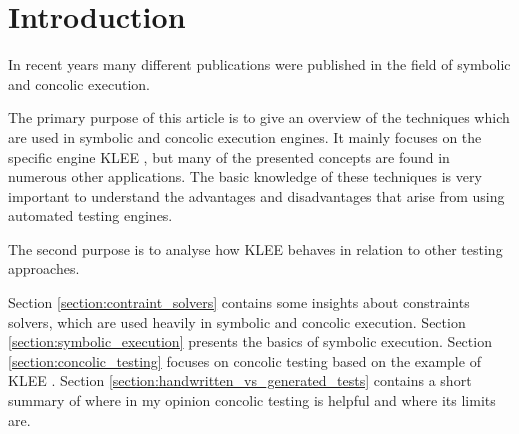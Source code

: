 \section{Introduction}
In recent years many different publications were published in the field of symbolic and concolic execution. 

The primary purpose of this article is to give an overview of the techniques which are used in symbolic and concolic execution engines.
It mainly focuses on the specific engine KLEE \cite{Cadar:2008:KUA:1855741.1855756}, but many of the presented concepts are found in numerous other applications.
The basic knowledge of these techniques is very important to understand the advantages and disadvantages that arise from using automated testing engines.

The second purpose is to analyse how KLEE behaves in relation to other testing approaches.

Section \ref{section:contraint_solvers} contains some insights about constraints solvers, which are used heavily in symbolic and concolic execution.
Section \ref{section:symbolic_execution} presents the basics of symbolic execution.
Section \ref{section:concolic_testing} focuses on concolic testing based on the example of KLEE \cite{Cadar:2008:KUA:1855741.1855756}. 
Section \ref{section:handwritten_vs_generated_tests} contains a short summary of where in my opinion concolic testing is helpful and where its limits are.